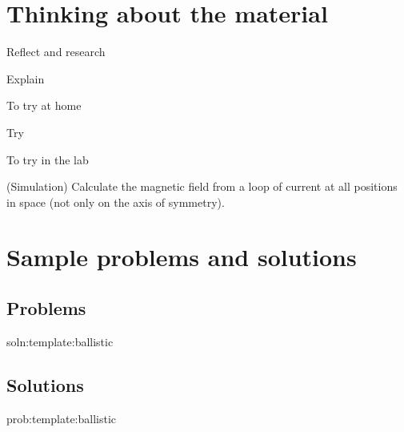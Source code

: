 \newpage
\section{Thinking about the material}

\begin{chapteractivity}{Reflect and research}
{
\item Explain
}
\end{chapteractivity}

\begin{chapteractivity}{To try at home}
{
\item Try
}
\end{chapteractivity}

\begin{chapteractivity}{To try in the lab}
{
\item (Simulation) Calculate the magnetic field from a loop of current at all positions in space (not only on the axis of symmetry). 
}
\end{chapteractivity}

\newpage
\section{Sample problems and solutions}
\subsection{Problems}
\begin{problem}{soln:template:ballistic}{\label{prob:template:ballistic} 

}
\end{problem}

\newpage
\subsection{Solutions}
\begin{solution}{prob:template:ballistic}\label{soln:template:ballistic}

\end{solution}

